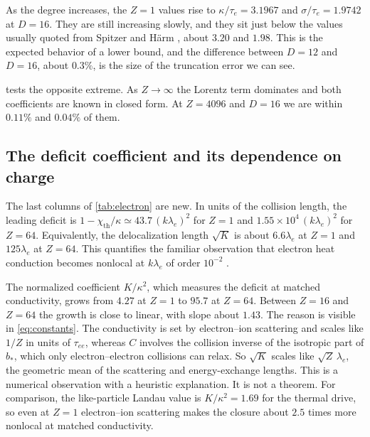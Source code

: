 \documentclass[11pt]{article}
\newcommand{\kap}{\kappa}
\newcommand{\thr}{\mathrm{th}}
\theoremstyle{definition}
\theoremstyle{remark}
\numberwithin{equation}{section}
\begin{document}
As the degree increases, the $Z=1$ values rise to $\kap/\tau_e=3.1967$ and
$\sigma/\tau_e=1.9742$ at $D=16$. They are still increasing slowly, and
they sit just below the values usually quoted from Spitzer and H\"arm
\cite{SpitzerHarm1953}, about $3.20$ and $1.98$. This is the expected
behavior of a lower bound, and the difference between $D=12$ and $D=16$,
about $0.3\%$, is the size of the truncation error we can see.

\begin{table}[tb]
\centering
\caption{Approach to the Lorentz limit $Z\to\infty$, where
$\sigma/\tau_e=32/(3\pi)$ and $\kap/\tau_e=128/(3\pi)$ in closed form.}
\label{tab:lorentz}
\small

\end{table}

 tests the opposite extreme. As $Z\to\infty$ the
Lorentz term dominates and both coefficients are known in closed form. At
$Z=4096$ and $D=16$ we are within $0.11\%$ and $0.04\%$ of them.

\subsection{The deficit coefficient and its dependence on charge}

The last columns of \cref{tab:electron} are new. In units of the
collision length, the leading deficit is
$1-\chi_\thr/\kap\simeq43.7\,(k\lambda_e)^2$ for $Z=1$ and
$1.55\times10^4\,(k\lambda_e)^2$ for $Z=64$. Equivalently, the
delocalization length $\sqrt K$ is about $6.6\lambda_e$ at $Z=1$ and
$125\lambda_e$ at $Z=64$. This quantifies the familiar observation that
electron heat conduction becomes nonlocal at $k\lambda_e$ of order
$10^{-2}$ \cite{LMV1983,EpperleinShort1991}.

The normalized coefficient $K/\kap^2$, which measures the deficit at
matched conductivity, grows from $4.27$ at $Z=1$ to $95.7$ at $Z=64$.
Between $Z=16$ and $Z=64$ the growth is close to linear, with slope about
$1.43$. The reason is visible in \eqref{eq:constants}. The conductivity is
set by electron--ion scattering and scales like $1/Z$ in units of
$\tau_{ee}$, whereas $C$ involves the collision inverse of the isotropic
part of $b_*$, which only electron--electron collisions can relax. So
$\sqrt K$ scales like $\sqrt Z\,\lambda_e$, the geometric mean of the
scattering and energy-exchange lengths. This is a numerical
observation with a heuristic explanation. It is not a theorem. For
comparison, the like-particle Landau value is $K/\kap^2=1.69$ for the
thermal drive, so even at $Z=1$ electron--ion scattering makes the
closure about $2.5$ times more nonlocal at matched conductivity.
\end{document}

